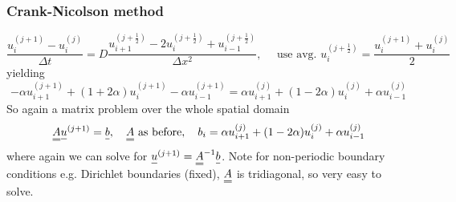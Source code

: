 \subsubsection{Crank-Nicolson method}
\begin{equation}
    \frac{u_i^{(j+1)}-u_i^{(j)}}{\Delta t}=D \frac{u_{i+1}^{\left(j+\frac{1}{2}\right)}-2 u_i^{\left(j+\frac{1}{2}\right)}+u_{i-1}^{\left(j+\frac{1}{2}\right)}}{\Delta x^2}, \quad \text { use avg. } u_i^{\left(j+\frac{1}{2}\right)}=\frac{u_i^{(j+1)}+u_i^{(j)}}{2}
\end{equation}
yielding
\begin{equation}
    -\alpha u_{i+1}^{(j+1)}+(1+2 \alpha) u_i^{(j+1)}-\alpha u_{i-1}^{(j+1)}=\alpha u_{i+1}^{(j)}+(1-2 \alpha) u_i^{(j)}+\alpha u_{i-1}^{(j)}
\end{equation}
So again a matrix problem over the whole spatial domain
\begin{equation}
    \mat{A} \vec{u}^{(j+1)} = \vec{b}, \quad \mat{A} \text{ as before}, \quad b_i = \alpha u_{i+1}^{(j)}+(1-2 \alpha) u_i^{(j)}+\alpha u_{i-1}^{(j)}
\end{equation}
where again we can solve for $\vec{u}^{(j+1)} = \mat{A}^{-1} \vec{b}$. Note for non-periodic boundary conditions
e.g. Dirichlet boundaries (fixed), $\mat{A}$ is tridiagonal, so very easy to solve.

